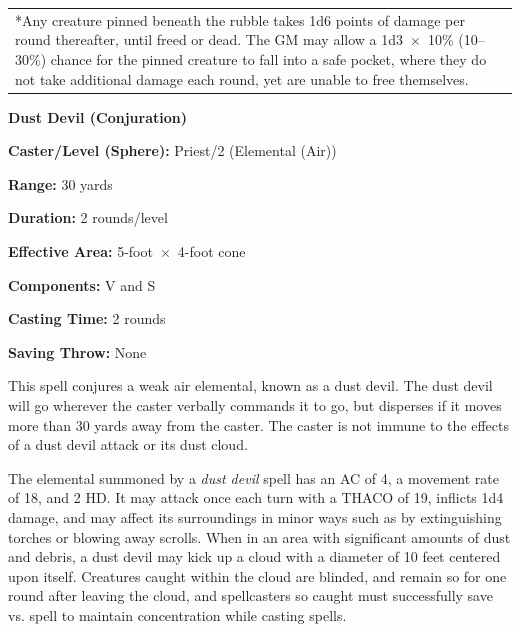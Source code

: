 \noindent\begin{tabular}{p{}}
*Any creature pinned beneath the rubble takes 1d6 points of damage per round thereafter, until freed or dead.  The GM may allow a 1d3~$\times$~10\% (10--30\%) chance for the pinned creature to fall into a safe pocket, where they do not take additional damage each round, yet are unable to free themselves. \\
\end{tabular}\vspace{.5em}

\begin{multicols}{2}

\vspace{1em}

\noindent
\begin{minipage}{\columnwidth}

\noindent \textbf{Dust Devil (Conjuration)}

\noindent \textbf{Caster/Level (Sphere):} Priest/2 (Elemental (Air))

\noindent \textbf{Range:} 30 yards

\noindent \textbf{Duration:} 2 rounds/level

\noindent \textbf{Effective Area:} 5-foot~$\times$~4-foot cone

\noindent \textbf{Components:} V and S

\noindent \textbf{Casting Time:} 2 rounds

\noindent \textbf{Saving Throw:} None

\end{minipage}

This spell conjures a weak air elemental, known as a dust devil.  The dust devil will go wherever the caster verbally commands it to go, but disperses if it moves more than 30 yards away from the caster.  The caster is not immune to the effects of a dust devil attack or its dust cloud.

The elemental summoned by a \textit{dust devil} spell has an AC of 4, a movement rate of 18, and 2 HD. It may attack once each turn with a THACO of 19, inflicts 1d4 damage, and may affect its surroundings in minor ways such as by extinguishing torches or blowing away scrolls. When in an area with significant amounts of dust and debris, a dust devil may kick up a cloud with a diameter of 10 feet centered upon itself. Creatures caught within the cloud are blinded, and remain so for one round after leaving the cloud, and spellcasters so caught must successfully save vs. spell to maintain concentration while casting spells.


\end{multicols}
